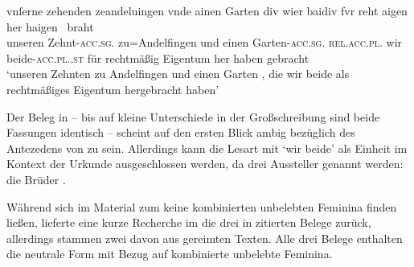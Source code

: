 \begin{exe}
\ex \label{ex:cao_samegend_inan_mm_beidiu}
	\begin{xlist}
	\ex \label{ex:cao_samegend_inan_mm_beidiu_1}
		\gll vnſerne zehenden zeandeluingen vnde ainen Garten
				\textelp{} div wier baidiv fvr reht aigen her
				haigen~ braht \\
			unseren Zehnt-\textsc{acc.sg}.\MascI{} zu=Andelfingen und einen
				Garten-\textsc{acc.sg.\MascI} {} \textsc{rel.acc.pl.\NeutI} wir
				beide-\textsc{acc.pl.\NeutI.st} für rechtmäßig Eigentum her haben
				gebracht \\
		\trans `unseren Zehnten zu Andelfingen und einen Garten \textelp{},
			die wir beide als recht\-mäßiges Eigentum hergebracht haben'
			\parencites(Nr.~1201~AB, Kl.~Heiligkreuztal, Kr.~Biberach, 1290)[472,10--18]{cao2}

	\end{xlist}
\end{exe}

Der Beleg in  -- bis auf kleine
Unterschiede in der Großschreibung sind beide Fassungen identisch -- scheint
auf den ersten Blick ambig bezüglich des Antezedens von  zu sein.
Allerdings kann die Lesart mit  `wir beide' als Einheit
im Kontext der Urkunde ausgeschlossen werden, da drei Aussteller genannt
werden: die Brüder 
\autocites(Nr.~1201~AB)[472,7]{cao2}.

Während sich im Material zum \CAO{} keine kombinierten unbelebten Feminina
finden ließen, lieferte eine kurze Recherche im \REM{} die drei in
 zitierten Belege zurück, allerdings stammen zwei davon
aus gereimten Texten. Alle drei Belege enthalten die neutrale Form 
mit Bezug auf kombinierte unbelebte Feminina.

